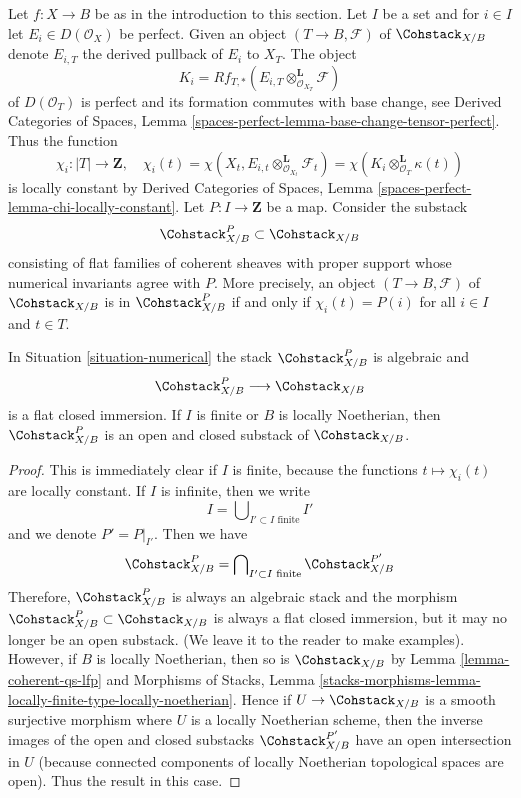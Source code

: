 \begin{situation}
\label{situation-numerical}
Let $f : X \to B$ be as in the introduction to this section. Let $I$
be a set and for $i \in I$ let $E_i \in D(\mathcal{O}_X)$ be perfect.
Given an object $(T \to B, \mathcal{F})$ of $\Cohstack_{X/B}$
denote $E_{i, T}$ the derived pullback of $E_i$ to $X_T$.
The object
$$
K_i = Rf_{T, *}(E_{i, T} \otimes_{\mathcal{O}_{X_T}}^\mathbf{L} \mathcal{F})
$$
of $D(\mathcal{O}_T)$ is perfect and its formation commutes with base change,
see Derived Categories of Spaces, Lemma
\ref{spaces-perfect-lemma-base-change-tensor-perfect}.
Thus the function
$$
\chi_i : |T| \longrightarrow \mathbf{Z},\quad
\chi_i(t) =
\chi(X_t, E_{i, t} \otimes_{\mathcal{O}_{X_t}}^\mathbf{L} \mathcal{F}_t) =
\chi(K_i \otimes_{\mathcal{O}_T}^\mathbf{L} \kappa(t))
$$
is locally constant by Derived Categories of Spaces, Lemma
\ref{spaces-perfect-lemma-chi-locally-constant}.
Let $P : I \to \mathbf{Z}$ be a map. Consider the substack
$$
\Cohstack^P_{X/B} \subset \Cohstack_{X/B}
$$
consisting of flat families of coherent sheaves with proper support
whose numerical invariants agree with $P$. More precisely, an object
$(T \to B, \mathcal{F})$ of $\Cohstack_{X/B}$ is in
$\Cohstack^P_{X/B}$ if and only if $\chi_i(t) = P(i)$ for all $i \in I$
and $t \in T$.
\end{situation}

\begin{lemma}
\label{lemma-open-P}
In Situation \ref{situation-numerical} the stack
$\Cohstack^P_{X/B}$ is algebraic and
$$
\Cohstack^P_{X/B} \longrightarrow \Cohstack_{X/B}
$$
is a flat closed immersion. If $I$ is finite or $B$ is locally
Noetherian, then $\Cohstack^P_{X/B}$ is an open and closed substack of
$\Cohstack_{X/B}$.
\end{lemma}

\begin{proof}
This is immediately clear if $I$ is finite, because the functions
$t \mapsto \chi_i(t)$ are locally constant. If $I$ is infinite, then
we write
$$
I = \bigcup\nolimits_{I' \subset I\text{ finite}} I'
$$
and we denote $P' = P|_{I'}$. Then we have
$$
\Cohstack^P_{X/B} = \bigcap\nolimits_{I' \subset I\text{ finite}}
\Cohstack^{P'}_{X/B}
$$
Therefore, $\Cohstack^P_{X/B}$ is always an algebraic stack and the morphism
$\Cohstack^P_{X/B} \subset \Cohstack_{X/B}$ is always a flat closed immersion,
but it may no longer be an open substack. (We leave it to the reader to
make examples). However, if $B$ is locally Noetherian, then so
is $\Cohstack_{X/B}$ by Lemma \ref{lemma-coherent-qs-lfp} and
Morphisms of Stacks, Lemma
\ref{stacks-morphisms-lemma-locally-finite-type-locally-noetherian}.
Hence if $U \to \Cohstack_{X/B}$ is a smooth surjective morphism
where $U$ is a locally Noetherian scheme, then the inverse images of
the open and closed substacks $\Cohstack^{P'}_{X/B}$
have an open intersection in $U$ (because connected components of
locally Noetherian topological spaces are open).
Thus the result in this case.
\end{proof}

